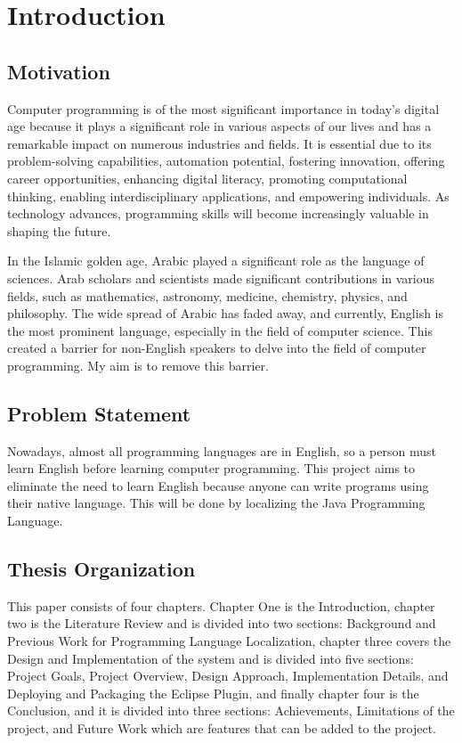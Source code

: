 \chapter{Introduction}
\section{Motivation}
Computer programming is of the most significant importance in today's digital age because it plays a significant role in various aspects of our lives and has a remarkable impact on numerous industries and fields. It is essential due to its problem-solving capabilities, automation potential, fostering innovation, offering career opportunities, enhancing digital literacy, promoting computational thinking, enabling interdisciplinary applications, and empowering individuals. As technology advances, programming skills will become increasingly valuable in shaping the future. 

In the Islamic golden age, Arabic played a significant role as the language of sciences. Arab scholars and scientists made significant contributions in various fields, such as mathematics, astronomy, medicine, chemistry, physics, and philosophy. The wide spread of Arabic has faded away, and currently, English is the most prominent language, especially in the field of computer science. This created a barrier for non-English speakers to delve into the field of computer programming. My aim is to remove this barrier.
\section{Problem Statement}
Nowadays, almost all programming languages are in English, so a person must learn English before learning computer programming. This project aims to eliminate the need to learn English because anyone can write programs using their native language. This will be done by localizing the Java Programming Language.
\section{Thesis Organization}
This paper consists of four chapters. Chapter One is the Introduction, chapter two is the Literature Review and is divided into two sections: Background and Previous Work for Programming Language Localization, chapter three covers the Design and Implementation of the system and is divided into five sections: Project Goals, Project Overview, Design Approach, Implementation Details, and Deploying and Packaging the Eclipse Plugin, and finally chapter four is the Conclusion, and it is divided into three sections: Achievements, Limitations of the project, and Future Work which are features that can be added to the project.
